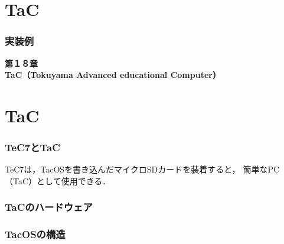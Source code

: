 \documentclass[unicode,handout]{beamer}                   %
\begin{document}
\section{TaC}
\begin{frame}
  \frametitle{実装例}
  \vfill
  \begin{center}
    \textbf{\LARGE 第１８章} \\
    \textbf{\LARGE TaC（Tokuyama Advanced educational Computer）}
  \end{center}
  \vfill
\end{frame}

\section{TaC}
\begin{frame}
  \frametitle{TeC7とTaC}
  \begin{minipage}{0.58\columnwidth}
  \end{minipage}
  \begin{minipage}{0.38\columnwidth}
  \end{minipage}
\vfill
TeC7は，TacOSを書き込んだマイクロSDカードを装着すると，
簡単なPC（TaC）として使用できる．
\end{frame}

\begin{frame}
  \frametitle{TaCのハードウェア}
\end{frame}

\begin{frame}
  \frametitle{TacOSの構造}
\end{frame}

\end{document}
